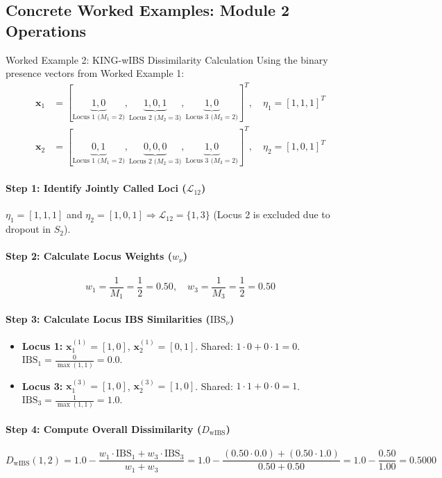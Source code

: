 \documentclass[11pt,a4paper]{article}
\begin{document}
\subsection{Concrete Worked Examples: Module 2 Operations}

\begin{examplebox}{Worked Example 2: KING-wIBS Dissimilarity Calculation}
Using the binary presence vectors from Worked Example 1:
\begin{align*}
\mathbf{x}_1 &= [\underbrace{1, 0}_{\text{Locus 1 ($M_1=2$)}}, \underbrace{1, 0, 1}_{\text{Locus 2 ($M_2=3$)}}, \underbrace{1, 0}_{\text{Locus 3 ($M_3=2$)}}]^T, \quad \eta_1 = [1, 1, 1]^T \\
\mathbf{x}_2 &= [\underbrace{0, 1}_{\text{Locus 1 ($M_1=2$)}}, \underbrace{0, 0, 0}_{\text{Locus 2 ($M_2=3$)}}, \underbrace{1, 0}_{\text{Locus 3 ($M_3=2$)}}]^T, \quad \eta_2 = [1, 0, 1]^T
\end{align*}

\paragraph{Step 1: Identify Jointly Called Loci ($\mathcal{L}_{12}$)}
$\eta_1 = [1, 1, 1]$ and $\eta_2 = [1, 0, 1] \Rightarrow \mathcal{L}_{12} = \{1, 3\}$ (Locus 2 is excluded due to dropout in $S_2$).

\paragraph{Step 2: Calculate Locus Weights ($w_\nu$)}
$$w_1 = \frac{1}{M_1} = \frac{1}{2} = 0.50, \quad w_3 = \frac{1}{M_3} = \frac{1}{2} = 0.50$$

\paragraph{Step 3: Calculate Locus IBS Similarities ($\text{IBS}_\nu$)}
\begin{itemize}
    \item \textbf{Locus 1:} $\mathbf{x}_1^{(1)} = [1, 0]$, $\mathbf{x}_2^{(1)} = [0, 1]$. Shared: $1 \cdot 0 + 0 \cdot 1 = 0$. $\text{IBS}_1 = \frac{0}{\max(1, 1)} = 0.0$.
    \item \textbf{Locus 3:} $\mathbf{x}_1^{(3)} = [1, 0]$, $\mathbf{x}_2^{(3)} = [1, 0]$. Shared: $1 \cdot 1 + 0 \cdot 0 = 1$. $\text{IBS}_3 = \frac{1}{\max(1, 1)} = 1.0$.
\end{itemize}

\paragraph{Step 4: Compute Overall Dissimilarity ($D_{\text{wIBS}}$)}
$$D_{\text{wIBS}}(1, 2) = 1.0 - \frac{w_1 \cdot \text{IBS}_1 + w_3 \cdot \text{IBS}_3}{w_1 + w_3} = 1.0 - \frac{(0.50 \cdot 0.0) + (0.50 \cdot 1.0)}{0.50 + 0.50} = 1.0 - \frac{0.50}{1.00} = \mathbf{0.5000}$$
\end{examplebox}
\end{document}
